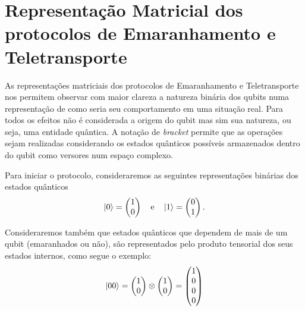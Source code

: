 
\chapter{Representação Matricial dos protocolos de Emaranhamento e Teletransporte}\label{app:matricial}

As representações matriciais dos protocolos de Emaranhamento e Teletransporte nos permitem observar com maior clareza a natureza binária dos qubits numa representação de como seria seu comportamento em uma situação real. Para todos os efeitos não é considerada a origem do qubit mas sim sua natureza, ou seja, uma entidade quântica. A notação de \textit{bracket} permite que as operações sejam realizadas considerando os estados quânticos possíveis armazenados dentro do qubit como versores num espaço complexo.

Para iniciar o protocolo, consideraremos as seguintes representações binárias dos estados quânticos
\begin{equation} \label{eq:01}
\ket{0} = \begin{pmatrix}
1 \\
0
\end{pmatrix} \quad \text{e} \quad
\ket{1} = \begin{pmatrix}
0 \\
1
\end{pmatrix}.
\end{equation}

Consideraremos também que estados quânticos que dependem de mais de um qubit (emaranhados ou não), são representados pelo produto tensorial dos seus estados internos, como segue o exemplo:
\begin{equation}\label{eq:00}
\ket{00} = \begin{pmatrix}
1 \\
0
\end{pmatrix} \otimes \begin{pmatrix}
1 \\
0
\end{pmatrix} = \begin{pmatrix}
1 \\
0 \\
0 \\
0
\end{pmatrix}
\end{equation}

